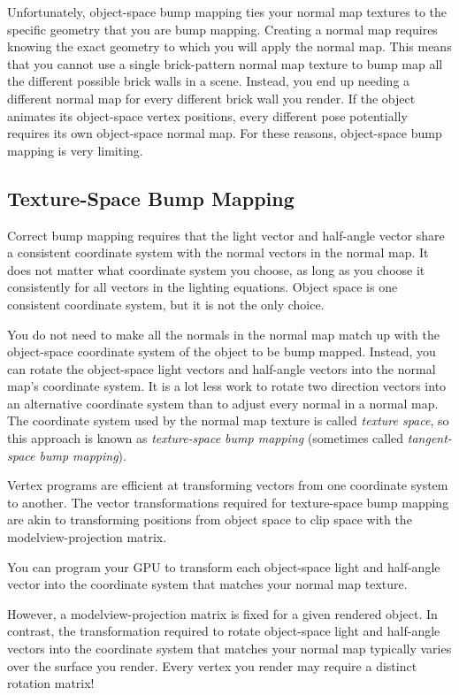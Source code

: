 \documentclass[../main.tex]{subfiles}
\begin{document}
Unfortunately, object-space bump mapping ties your normal map textures to the specific geometry that you are bump mapping. Creating a normal map requires knowing the exact geometry to which you will apply the normal map. This means that you cannot use a single brick-pattern normal map texture to bump map all the different possible brick walls in a scene. Instead, you end up needing a different normal map for every different brick wall you render. If the object animates its object-space vertex positions, every different pose potentially requires its own object-space normal map. For these reasons, object-space bump mapping is very limiting.

\subsection*{Texture-Space Bump Mapping}

Correct bump mapping requires that the light vector and half-angle vector share a consistent coordinate system with the normal vectors in the normal map. It does not matter what coordinate system you choose, as long as you choose it consistently for all vectors in the lighting equations. Object space is one consistent coordinate system, but it is not the only choice.

You do not need to make all the normals in the normal map match up with the object-space coordinate system of the object to be bump mapped. Instead, you can rotate the object-space light vectors and half-angle vectors into the normal map's coordinate system. It is a lot less work to rotate two direction vectors into an alternative coordinate system than to adjust every normal in a normal map. The coordinate system used by the normal map texture is called \textit{texture space}, so this approach is known as \textit{texture-space bump mapping} (sometimes called \textit{tangent-space bump mapping}).

Vertex programs are efficient at transforming vectors from one coordinate system to another. The vector transformations required for texture-space bump mapping are akin to transforming positions from object space to clip space with the modelview-projection matrix.

You can program your GPU to transform each object-space light and half-angle vector into the coordinate system that matches your normal map texture.

However, a modelview-projection matrix is fixed for a given rendered object. In contrast, the transformation required to rotate object-space light and half-angle vectors into the coordinate system that matches your normal map typically varies over the surface you render. Every vertex you render may require a distinct rotation matrix!
\end{document}
